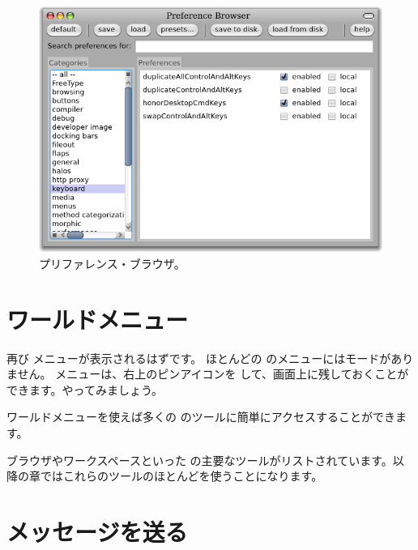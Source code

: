 \documentclass[a4paper,10pt,twoside]{book}
\begin{document}
\begin{figure}[htb]
\centerline{\includegraphics[width=\textwidth]{PreferenceBrowser}}
\caption{プリファレンス・ブラウザ。}
\end{figure}


\section{ワールドメニュー}

再び  メニューが表示されるはずです。
ほとんどの \pharo のメニューにはモードがありません。 メニューは、右上のピンアイコンを \click して、画面上に残しておくことができます。やってみましょう。

ワールドメニューを使えば多くの \pharo のツールに簡単にアクセスすることができます。


ブラウザやワークスペースといった \pharo の主要なツールがリストされています。以降の章ではこれらのツールのほとんどを使うことになります。

\section{メッセージを送る}
\end{document}

